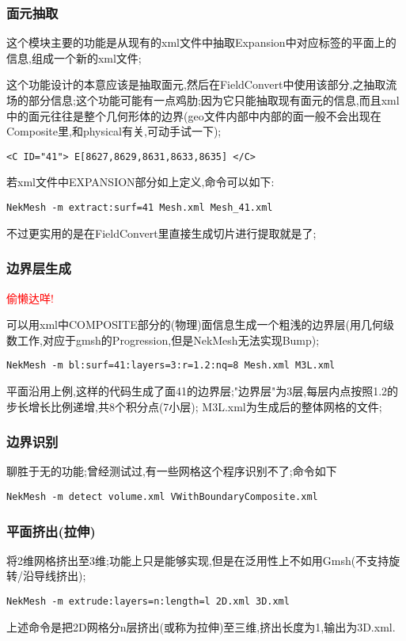 \subsubsection{面元抽取} \label{ExtractFace}
这个模块主要的功能是从现有的xml文件中抽取Expansion中对应标签的平面上的信息,组成一个新的xml文件;\par
这个功能设计的本意应该是抽取面元,然后在FieldConvert中使用该部分,之抽取流场的部分信息;这个功能可能有一点鸡肋;因为它只能抽取现有面元的信息,而且xml中的面元往往是整个几何形体的边界(geo文件内部中内部的面一般不会出现在Composite里,和physical有关,可动手试一下);\par
\begin{lstlisting}[frame=single]
 <C ID="41"> E[8627,8629,8631,8633,8635] </C>
\end{lstlisting}
\par
若xml文件中EXPANSION部分如上定义,命令可以如下:
\begin{lstlisting}[frame=single]
NekMesh -m extract:surf=41 Mesh.xml Mesh_41.xml
\end{lstlisting}
\par
不过更实用的是在FieldConvert里直接生成切片进行提取就是了;

\subsubsection{边界层生成}
\textcolor{red}{偷懒达咩!}\par
可以用xml中COMPOSITE部分的(物理)面信息生成一个粗浅的边界层(用几何级数工作,对应于gmsh的Progression,但是NekMesh无法实现Bump);
\begin{lstlisting}[frame=single]
NekMesh -m bl:surf=41:layers=3:r=1.2:nq=8 Mesh.xml M3L.xml
\end{lstlisting}
\par
平面沿用上例,这样的代码生成了面41的边界层;"边界层"为3层,每层内点按照1.2的步长增长比例递增,共8个积分点(7小层); M3L.xml为生成后的整体网格的文件;

\subsubsection{边界识别}
聊胜于无的功能;曾经测试过,有一些网格这个程序识别不了;命令如下
\begin{lstlisting}[frame=single]
NekMesh -m detect volume.xml VWithBoundaryComposite.xml
\end{lstlisting}
\par

\subsubsection{平面挤出(拉伸)}
将2维网格挤出至3维;功能上只是能够实现,但是在泛用性上不如用Gmsh(不支持旋转/沿导线挤出);
\begin{lstlisting}[frame=single]
NekMesh -m extrude:layers=n:length=l 2D.xml 3D.xml
\end{lstlisting}
\par
上述命令是把2D网格分n层挤出(或称为拉伸)至三维,挤出长度为1,输出为3D.xml.

